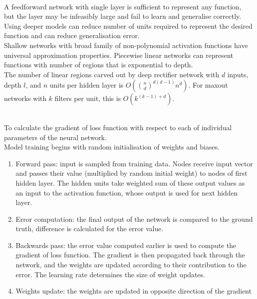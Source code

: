 \begin{remark} \\
A feedforward network with single layer is sufficient to represent any function, but the layer may be infeasibly large and fail to learn and generalise correctly. Using deeper models can reduce number of units required to represent the desired function and can reduce generalisation error.\\
Shallow networks with broad family of non-polynomial activation functions have universal approximation properties. Piecewise linear networks can represent functions with number of regions that is exponential to depth.\\
The number of linear regions carved out by deep rectifier network with $d$ inputs, depth $l$, and $n$ units per hidden layer is $O(\binom{n}{d}^{d(d-1)} n^d)$. For maxout networks with $k$ filters per unit, this is $O(k^{(k-1)+d})$.
\end{remark}

\begin{remark} \\
To calculate the gradient of loss function with respect to each of individual parameters of the neural network.\\
Model training begins with random initialisation of weights and biases.
\begin{enumerate}[label=\roman*.]
\setlength{\itemsep}{0pt}
\item Forward pass: input is sampled from training data. Nodes receive input vector and passes their value (multiplied by random initial weight) to nodes of first hidden layer. The hidden units take weighted sum of these output values as an input to the activation function, whose output is used for next hidden layer.
\item Error computation: the final output of the network is compared to the ground truth, difference is calculated for the error value.
\item Backwards pass: the error value computed earlier is used to compute the gradient of loss function. The gradient is then propagated back through the network, and the weights are updated according to their contribution to the error. The learning rate determines the size of weight updates.
\item Weights update: the weights are updated in opposite direction of the gradient
\end{enumerate}
\end{remark}


